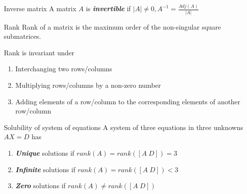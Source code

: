 \documentclass[titlepage, 12pt]{book}
\begin{document}
\begin{definition}{Inverse matrix}{}
    A matrix $A$ is \textbf{\textit{invertible}} if $|A|\neq 0, A^{-1} =
    \frac{Adj(A)}{|A|}$
\end{definition}

\begin{definition}{Rank}{}
    Rank of a matrix is the maximum order of the non-singular square
    submatrices.
\end{definition}

Rank is invariant under
    \begin{enumerate}
        \item Interchanging two rows/columns
        \item Multiplying rows/columns by a non-zero number
        \item Adding elements of a row/column to the corresponding elements of
            another row/column
    \end{enumerate}

\begin{theorem}{Solubility of system of equations}{}
    A system of three equations in three unknowns $AX = D$ has
    \begin{enumerate}
        \item \textbf{\textit{Unique}} solutions if $rank(A) = rank([A\;D]) = 3$
        \item \textbf{\textit{Infinite}} solutions if $rank(A) = rank([A\;D]) < 3$
        \item \textbf{\textit{Zero}} solutions if $rank(A)\neq rank([A\; D])$
    \end{enumerate}
\end{theorem}
\end{document}
